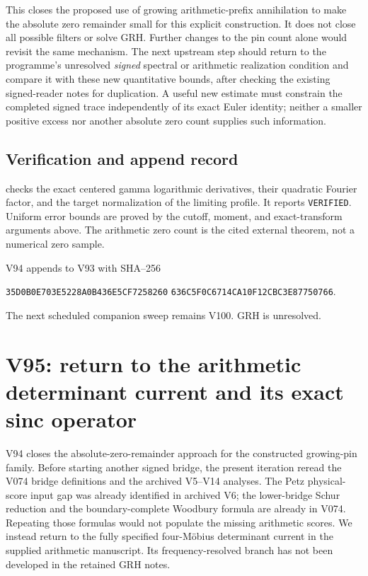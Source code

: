 \documentclass[11pt]{article}
\theoremstyle{definition}
\theoremstyle{remark}
\begin{document}
This closes the proposed use of growing arithmetic-prefix annihilation
to make the absolute zero remainder small for this explicit construction.
It does not close all possible filters or solve GRH.  Further changes
to the pin count alone would revisit the same mechanism.  The next
upstream step should return to the programme's unresolved \emph{signed}
spectral or arithmetic realization condition and compare it with these
new quantitative bounds, after checking the existing signed-reader
notes for duplication.  A useful new estimate must constrain the
completed signed trace independently of its exact Euler identity;
neither a smaller positive excess nor another absolute zero count
supplies such information.

\subsection*{Verification and append record}

 checks the exact
centered gamma logarithmic derivatives, their quadratic Fourier factor,
and the target normalization of the limiting profile.  It reports
\texttt{VERIFIED}.  Uniform error bounds are proved by the cutoff,
moment, and exact-transform arguments above.  The arithmetic zero
count is the cited external theorem, not a numerical zero sample.

V94 appends to V93 with SHA--256
\begin{center}
\texttt{35D0B0E703E5228A0B436E5CF7258260}\allowbreak
\texttt{636C5F0C6714CA10F12CBC3E87750766}.
\end{center}
The next scheduled companion sweep remains V100.  GRH is unresolved.
\endgroup

\clearpage
\section{V95: return to the arithmetic determinant current and its exact sinc operator}
\label{sec:f2v95-sinc-operator}
\providecommand{\mathscr}[1]{\mathcal{#1}}
\begingroup
\setcounter{equation}{0}
\renewcommand{\theequation}{N95.\arabic{equation}}
\renewcommand{\theHequation}{f2v95.\arabic{equation}}

V94 closes the absolute-zero-remainder approach for the constructed
growing-pin family.  Before starting another signed bridge, the present
iteration reread the V074 bridge definitions and the archived V5--V14
analyses.  The Petz physical-score input gap was already identified in
archived V6; the lower-bridge Schur reduction and the boundary-complete
Woodbury formula are already in V074.  Repeating those formulas would
not populate the missing arithmetic scores.  We instead return to the
fully specified four-M\"obius determinant current in the supplied
arithmetic manuscript.  Its frequency-resolved branch has not been
developed in the retained GRH notes.
\end{document}
